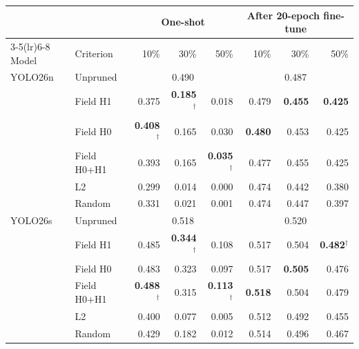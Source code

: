 \begin{tabular}{llrrrrrr}
\toprule
 & & \multicolumn{3}{c}{One-shot} & \multicolumn{3}{c}{After 20-epoch fine-tune} \\
\cmidrule(lr){3-5}\cmidrule(lr){6-8}
Model & Criterion & 10\% & 30\% & 50\% & 10\% & 30\% & 50\% \\
\midrule
YOLO26n & Unpruned & \multicolumn{3}{c}{0.490} & \multicolumn{3}{c}{0.487} \\
 & Field H1 & 0.375 & \textbf{0.185}$^\dagger$ & 0.018 & 0.479 & \textbf{0.455} & \textbf{0.425} \\
 & Field H0 & \textbf{0.408}$^\dagger$ & 0.165 & 0.030 & \textbf{0.480} & 0.453 & 0.425 \\
 & Field H0+H1 & 0.393 & 0.165 & \textbf{0.035}$^\dagger$ & 0.477 & 0.455 & 0.425 \\
 & L2 & 0.299 & 0.014 & 0.000 & 0.474 & 0.442 & 0.380 \\
 & Random & 0.331 & 0.021 & 0.001 & 0.474 & 0.447 & 0.397 \\
\midrule
YOLO26s & Unpruned & \multicolumn{3}{c}{0.518} & \multicolumn{3}{c}{0.520} \\
 & Field H1 & 0.485 & \textbf{0.344}$^\dagger$ & 0.108 & 0.517 & 0.504 & \textbf{0.482}$^\dagger$ \\
 & Field H0 & 0.483 & 0.323 & 0.097 & 0.517 & \textbf{0.505} & 0.476 \\
 & Field H0+H1 & \textbf{0.488}$^\dagger$ & 0.315 & \textbf{0.113}$^\dagger$ & \textbf{0.518} & 0.504 & 0.479 \\
 & L2 & 0.400 & 0.077 & 0.005 & 0.512 & 0.492 & 0.455 \\
 & Random & 0.429 & 0.182 & 0.012 & 0.514 & 0.496 & 0.467 \\
\bottomrule
\end{tabular}
